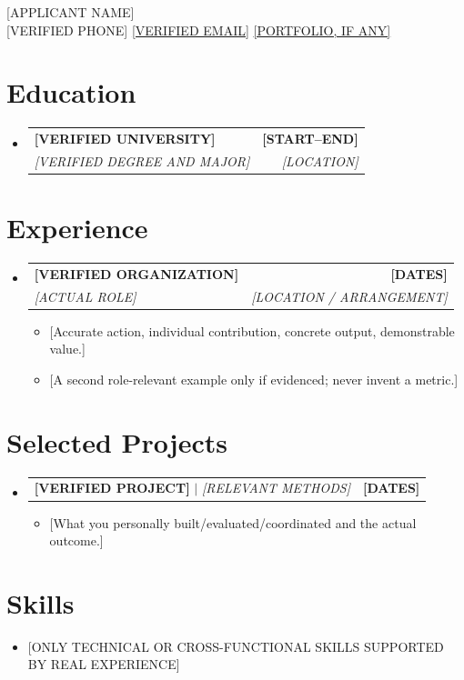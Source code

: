 \documentclass[letterpaper,11pt]{article}
\makeatletter
\newcommand{\resumeItem}[1]{\item\small{#1}}
\newcommand{\resumeSubheading}[4]{%
  \vspace{-2pt}\item
  \begin{tabular*}{1.0\textwidth}[t]{l@{\extracolsep{\fill}}r}
  \textbf{#1} & \textbf{\small #2} \\
  \textit{\small #3} & \textit{\small #4} \\
  \end{tabular*}\vspace{-7pt}
}
\newcommand{\resumeProjectHeading}[2]{%
  \vspace{-2pt}\item
  \begin{tabular*}{1.0\textwidth}[t]{l@{\extracolsep{\fill}}r}
  \small #1 & \textbf{\small #2} \\
  \end{tabular*}\vspace{-7pt}
}
\newcommand{\resumeSubHeadingListStart}{\begin{itemize}[leftmargin=0in,label={}]}
\newcommand{\resumeSubHeadingListEnd}{\end{itemize}}
\newcommand{\resumeItemListStart}{\begin{itemize}[leftmargin=0.25in,itemsep=1pt]}
\newcommand{\resumeItemListEnd}{\end{itemize}\vspace{-5pt}}
\makeatother
\begin{document}
\begin{center}
{\Huge \scshape [APPLICANT NAME]}\\ \vspace{3pt}
\small [VERIFIED PHONE] \quad
\href{mailto:applicant@example.com}{[VERIFIED EMAIL]} \quad
\href{https://example.com}{[PORTFOLIO, IF ANY]}
\vspace{-8pt}
\end{center}

\section{Education}
\resumeSubHeadingListStart
\resumeSubheading{[VERIFIED UNIVERSITY]}{[START--END]}{[VERIFIED DEGREE AND MAJOR]}{[LOCATION]}
\resumeSubHeadingListEnd

\section{Experience}
\resumeSubHeadingListStart
\resumeSubheading{[VERIFIED ORGANIZATION]}{[DATES]}{[ACTUAL ROLE]}{[LOCATION / ARRANGEMENT]}
\resumeItemListStart
\resumeItem{[Accurate action, individual contribution, concrete output, demonstrable value.]}
\resumeItem{[A second role-relevant example only if evidenced; never invent a metric.]}
\resumeItemListEnd
\resumeSubHeadingListEnd

\section{Selected Projects}
\resumeSubHeadingListStart
\resumeProjectHeading{\textbf{[VERIFIED PROJECT]} $|$ \emph{[RELEVANT METHODS]}}{[DATES]}
\resumeItemListStart
\resumeItem{[What you personally built/evaluated/coordinated and the actual outcome.]}
\resumeItemListEnd
\resumeSubHeadingListEnd

\section{Skills}
\begin{itemize}[leftmargin=0.15in,label={}]
\small\item{[ONLY TECHNICAL OR CROSS-FUNCTIONAL SKILLS SUPPORTED BY REAL EXPERIENCE]}
\end{itemize}

\end{document}
